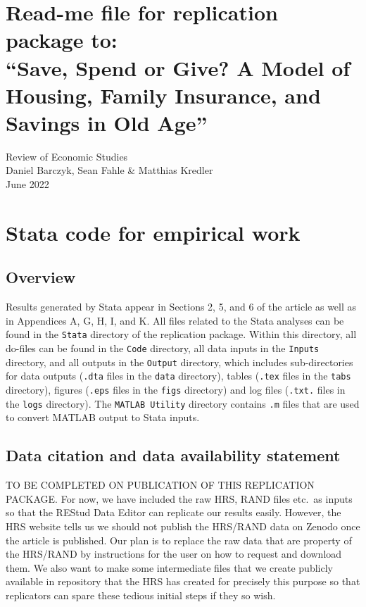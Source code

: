 \documentclass[a4,12p]{article}
\begin{document}
\section*{Read-me file for replication package to:\\
	``Save, Spend or Give? A Model of Housing, Family Insurance, and Savings in Old Age''} 
	Review of Economic Studies\\
	Daniel Barczyk, Sean Fahle \& Matthias Kredler\\
	June 2022

	
\section{Stata code for empirical work} 	

\subsection{Overview}

Results generated by Stata appear in Sections 2, 5, and 6 of the article as well as in Appendices A, G, H, I, and K. All files related to the Stata analyses can be found in the {\tt Stata} directory of the replication package. Within this directory, all do-files can be found in the {\tt Code} directory, all data inputs in the {\tt Inputs} directory, and all outputs in the {\tt Output} directory, which includes sub-directories for data outputs ({\tt .dta} files in the {\tt data} directory), tables ({\tt .tex} files in the {\tt tabs} directory), figures ({\tt .eps} files in the {\tt figs} directory) and log files ({\tt .txt.} files in the {\tt logs} directory). The {\tt MATLAB Utility} directory contains {\tt .m} files that are used to convert MATLAB output to Stata inputs.


\subsection{Data citation and data availability statement}

TO BE COMPLETED ON PUBLICATION OF THIS REPLICATION PACKAGE. For now, we have included the raw HRS, RAND files etc.\ as inputs so that the REStud Data Editor can replicate our results easily. However, the HRS website tells us we should not publish the HRS/RAND data on Zenodo once the article is published. Our plan is to replace the raw data that are property of the HRS/RAND by instructions for the user on how to request and download them. We also want to make some intermediate files that we create publicly available in repository that the HRS has created for precisely this purpose so that replicators can spare these tedious initial steps if they so wish.
\end{document}
